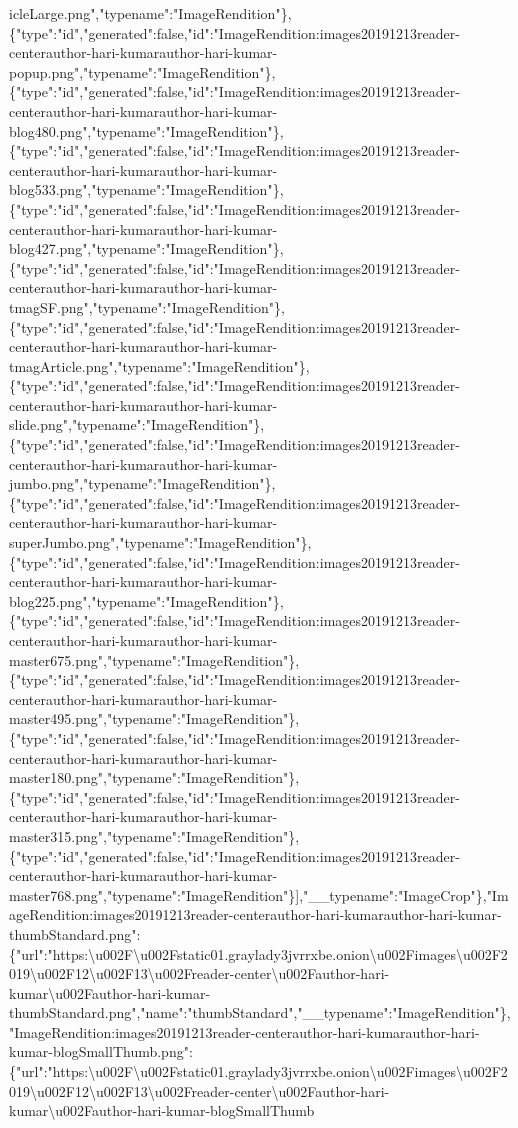 icleLarge.png","typename":"ImageRendition"\},\{"type":"id","generated":false,"id":"ImageRendition:images20191213reader-centerauthor-hari-kumarauthor-hari-kumar-popup.png","typename":"ImageRendition"\},\{"type":"id","generated":false,"id":"ImageRendition:images20191213reader-centerauthor-hari-kumarauthor-hari-kumar-blog480.png","typename":"ImageRendition"\},\{"type":"id","generated":false,"id":"ImageRendition:images20191213reader-centerauthor-hari-kumarauthor-hari-kumar-blog533.png","typename":"ImageRendition"\},\{"type":"id","generated":false,"id":"ImageRendition:images20191213reader-centerauthor-hari-kumarauthor-hari-kumar-blog427.png","typename":"ImageRendition"\},\{"type":"id","generated":false,"id":"ImageRendition:images20191213reader-centerauthor-hari-kumarauthor-hari-kumar-tmagSF.png","typename":"ImageRendition"\},\{"type":"id","generated":false,"id":"ImageRendition:images20191213reader-centerauthor-hari-kumarauthor-hari-kumar-tmagArticle.png","typename":"ImageRendition"\},\{"type":"id","generated":false,"id":"ImageRendition:images20191213reader-centerauthor-hari-kumarauthor-hari-kumar-slide.png","typename":"ImageRendition"\},\{"type":"id","generated":false,"id":"ImageRendition:images20191213reader-centerauthor-hari-kumarauthor-hari-kumar-jumbo.png","typename":"ImageRendition"\},\{"type":"id","generated":false,"id":"ImageRendition:images20191213reader-centerauthor-hari-kumarauthor-hari-kumar-superJumbo.png","typename":"ImageRendition"\},\{"type":"id","generated":false,"id":"ImageRendition:images20191213reader-centerauthor-hari-kumarauthor-hari-kumar-blog225.png","typename":"ImageRendition"\},\{"type":"id","generated":false,"id":"ImageRendition:images20191213reader-centerauthor-hari-kumarauthor-hari-kumar-master675.png","typename":"ImageRendition"\},\{"type":"id","generated":false,"id":"ImageRendition:images20191213reader-centerauthor-hari-kumarauthor-hari-kumar-master495.png","typename":"ImageRendition"\},\{"type":"id","generated":false,"id":"ImageRendition:images20191213reader-centerauthor-hari-kumarauthor-hari-kumar-master180.png","typename":"ImageRendition"\},\{"type":"id","generated":false,"id":"ImageRendition:images20191213reader-centerauthor-hari-kumarauthor-hari-kumar-master315.png","typename":"ImageRendition"\},\{"type":"id","generated":false,"id":"ImageRendition:images20191213reader-centerauthor-hari-kumarauthor-hari-kumar-master768.png","typename":"ImageRendition"\}{]},"\_\_typename":"ImageCrop"\},"ImageRendition:images20191213reader-centerauthor-hari-kumarauthor-hari-kumar-thumbStandard.png":\{"url":"https:\textbackslash{}u002F\textbackslash{}u002Fstatic01.graylady3jvrrxbe.onion\textbackslash{}u002Fimages\textbackslash{}u002F2019\textbackslash{}u002F12\textbackslash{}u002F13\textbackslash{}u002Freader-center\textbackslash{}u002Fauthor-hari-kumar\textbackslash{}u002Fauthor-hari-kumar-thumbStandard.png","name":"thumbStandard","\_\_typename":"ImageRendition"\},"ImageRendition:images20191213reader-centerauthor-hari-kumarauthor-hari-kumar-blogSmallThumb.png":\{"url":"https:\textbackslash{}u002F\textbackslash{}u002Fstatic01.graylady3jvrrxbe.onion\textbackslash{}u002Fimages\textbackslash{}u002F2019\textbackslash{}u002F12\textbackslash{}u002F13\textbackslash{}u002Freader-center\textbackslash{}u002Fauthor-hari-kumar\textbackslash{}u002Fauthor-hari-kumar-blogSmallThumb